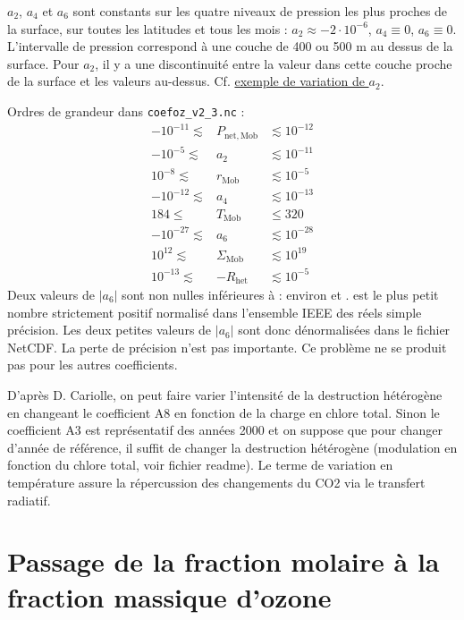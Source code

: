 \documentclass[a4paper,english,french]{article}
\begin{document}
$a_2$, $a_4$ et $a_6$ sont constants sur les quatre niveaux de
pression les plus proches de la surface, sur toutes les latitudes et
tous les mois : $a_2 \approx - 2 \cdot 10^{-6}$, $a_4 \equiv 0$, $a_6
\equiv 0$. L'intervalle de pression correspond à une couche de 400 ou
500 m au dessus de la surface. Pour $a_2$, il y a une discontinuité
entre la valeur dans cette couche proche de la surface et les valeurs
au-dessus. Cf.
\href{file:///user/guez/Documents/Datasets/Ozone/Cariolle/Cariolle_v2_3/a2.ps}{exemple
  de variation de $a_2$}.

Ordres de grandeur dans \verb+coefoz_v2_3.nc+ :
\begin{displaymath}
  \begin{array}{rcl}
  - 10^{-11} \lesssim & P_\mathrm{net,Mob} & \lesssim 10^{-12} \\
  - 10^{-5} \lesssim & a_2 & \lesssim 10^{-11} \\
  10^{-8} \lesssim & r_\mathrm{Mob} & \lesssim 10^{-5} \\
  - 10^{-12} \lesssim & a_4 & \lesssim 10^{-13} \\
  184 \le & T_\mathrm{Mob} & \le 320 \\
  - 10^{-27} \lesssim & a_6 & \lesssim 10^{-28} \\
  10^{12} \lesssim & \Sigma_\mathrm{Mob} & \lesssim 10^{19} \\
  10^{-13} \lesssim & - R_\mathrm{het} & \lesssim 10^{-5}    
  \end{array}
\end{displaymath}
Deux valeurs de $|a_6|$ sont non nulles inférieures à  :
environ  et .  est le plus petit
nombre strictement positif normalisé dans l'ensemble IEEE des réels
simple précision. Les deux petites valeurs de $|a_6|$ sont donc
dénormalisées dans le fichier NetCDF. La perte de précision n'est pas
importante. Ce problème ne se produit pas pour les autres
coefficients.

D'après D. Cariolle, on peut faire varier l'intensité de la
destruction hétérogène en changeant le coefficient A8 en fonction de
la charge en chlore total. Sinon le coefficient A3 est représentatif
des années 2000 et on suppose que pour changer d'année de référence,
il suffit de changer la destruction hétérogène (modulation en fonction
du chlore total, voir fichier readme). Le terme de variation en
température assure la répercussion des changements du CO2 via le
transfert radiatif.

\section[Fraction molaire à fraction massique d'ozone]{Passage
  de la fraction molaire à la fraction massique d'ozone}
\end{document}
